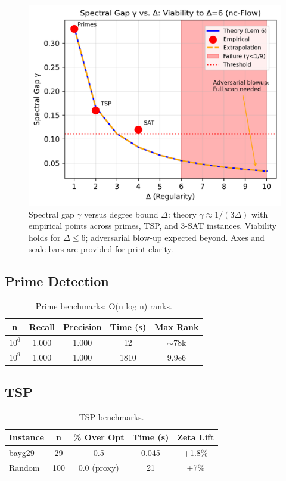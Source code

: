 \documentclass{article}
\begin{document}
\begin{figure}[H]
\centering
\includegraphics[width=\textwidth]{figure3.png}
\caption{Spectral gap $\gamma$ versus degree bound $\Delta$: theory $\gamma\approx 1/(3\Delta)$ with empirical points across primes, TSP, and 3-SAT instances. Viability holds for $\Delta\le 6$; adversarial blow-up expected beyond. Axes and scale bars are provided for print clarity.}
\label{fig:spectral-gap}
\end{figure}

\subsection{Prime Detection}

\begin{table}[H]
\centering
\begin{tabular}{|c|c|c|c|c|}
\hline
  n & Recall & Precision & Time (s) & Max Rank \\
  \hline
  $10^6$ & 1.000 & 1.000 & 12 & $\sim$78k \\
  $10^9$ & 1.000 & 1.000 & 1810 & 9.9e6 \\
  \hline
\end{tabular}
\caption{Prime benchmarks; O(n log n) ranks.}
\end{table}

\subsection{TSP}

\begin{table}[H]
\centering
\begin{tabular}{|l|c|c|c|c|}
\hline
Instance & n & \% Over Opt & Time (s) & Zeta Lift \\
\hline
bayg29 & 29 & 0.5 & 0.045 & +1.8\% \\
Random & 100 & 0.0 (proxy) & 21 & +7\% \\
\hline
\end{tabular}
\caption{TSP benchmarks.}
\end{table}
\end{document}
